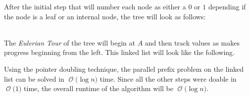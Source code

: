 \documentclass[12pt]{article}
\newcommand{\BigO}[1]{\ensuremath{\operatorname{\mathcal{O}}\bigl(#1\bigr)}}
\begin{document}
After the initial step that will number each node as either a $0$ or
$1$ depending if the node is a leaf or an internal node, the tree
will look as follows:\\\\ 
\begin{center}
\end{center} 
The \textit{Eulerian Tour} of the tree will begin at $A$ and then
track values as makes progress beginning from the left.  This linked
list will look like the following.

Using the pointer doubling technique, the parallel prefix problem on
the linked list can be solved in \BigO{\log n} time.  Since all the
other steps were doable in \BigO{1} time, the overall runtime of the
algorithm will be \BigO{\log n}.
\end{document}

